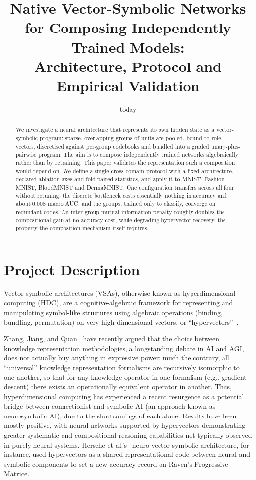 \documentclass[conference]{IEEEtran}
\title{Native Vector-Symbolic Networks for Composing Independently Trained Models:\\
Architecture, Protocol and Empirical Validation}
\author{
\IEEEauthorblockA{Creative Experience: Transformative Project II\\
Bachelor’s in Computer Science -- PUCPR
\\[3ex]
Class 8B -- Team 11 \\
Bruno Betiatto, Mohamad Diab, Henrique Godoy, Lucca Magalhães, Gabriel Schneider \\
{\tt\small \{bruno.betiatto, mohamad.diab, henrique.godoy, lucca.magalhaes, gabriel.schneider\}@pucpr.edu.br}
}
}
\date{today}
\begin{document}
\maketitle

\begin{abstract}
We investigate a neural architecture that represents its own hidden state as a
vector-symbolic program: sparse, overlapping groups of units are pooled, bound
to role vectors, discretised against per-group codebooks and bundled into a
graded unary-plus-pairwise program. The aim is to compose independently trained
networks algebraically rather than by retraining. This paper validates the
representation such a composition would depend on. We define a single
cross-domain protocol with a fixed architecture, declared ablation axes and
fold-paired statistics, and apply it to MNIST, Fashion-MNIST, BloodMNIST and
DermaMNIST. One configuration transfers across all four without retuning; the
discrete bottleneck costs essentially nothing in accuracy and about $0.008$
macro AUC; and the groups, trained only to classify, converge on redundant
codes. An inter-group mutual-information penalty roughly doubles the
compositional gain at no accuracy cost, while degrading hypervector recovery,
the property the composition mechanism itself requires.
\end{abstract}

\section{Project Description}
\label{sec:intro}

Vector symbolic architectures (VSAs), otherwise known as hyperdimensional computing (HDC), are a cognitive-algebraic framework for representing and manipulating symbol-like structures using algebraic operations (binding, bundling, permutation) on very high-dimensional vectors, or ``hypervectors''~\cite{kanerva2009hyperdimensional,kleyko2022survey}.

Zhang, Jiang, and Quan~\cite{zhang2025formalisms} have recently argued that the choice between knowledge representation methodologies, a longstanding debate in AI and AGI, does not actually buy anything in expressive power: much the contrary, all ``universal'' knowledge representation formalisms are recursively isomorphic to one another, so that for any knowledge operator in one formalism (e.g., gradient descent) there exists an operationally equivalent operator in another. Thus, hyperdimensional computing has experienced a recent resurgence as a potential bridge between connectionist and symbolic AI (an approach known as neurosymbolic AI), due to the shortcomings of each alone. Results have been mostly positive, with neural networks supported by hypervectors demonstrating greater systematic and compositional reasoning capabilities not typically observed in purely neural systems. Hersche et al.'s~\cite{hersche2023nvsa} neuro-vector-symbolic architecture, for instance, used hypervectors as a shared representational code between neural and symbolic components to set a new accuracy record on Raven's Progressive Matrice.
\end{document}

